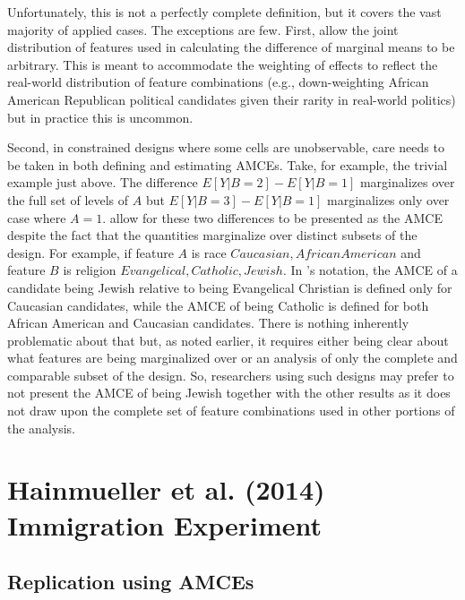 \documentclass[a4paper,12pt]{article}\usepackage[]{graphicx}\usepackage[]{color}
\begin{document}
Unfortunately, this is not a perfectly complete definition, but it covers the vast majority of applied cases. The exceptions are few. First, \citeauthor{HainmuellerHopkinsYamamoto2014} allow the joint distribution of features used in calculating the difference of marginal means to be arbitrary. This is meant to accommodate the weighting of effects to reflect the real-world distribution of feature combinations (e.g., down-weighting African American Republican political candidates given their rarity in real-world politics) but in practice this is uncommon.

Second, in constrained designs where some cells are unobservable, care needs to be taken in both defining and estimating AMCEs. Take, for example, the trivial example just above. The difference $E[Y|B=2]-E[Y|B=1]$ marginalizes over the full set of levels of $A$ but $E[Y|B=3]-E[Y|B=1]$ marginalizes only over case where $A=1$. \citeauthor{HainmuellerHopkinsYamamoto2014} allow for these two differences to be presented as the AMCE despite the fact that the quantities marginalize over distinct subsets of the design. For example, if feature $A$ is race ${Caucasian, African American}$ and feature $B$ is religion ${Evangelical, Catholic, Jewish}$. In \citeauthor{HainmuellerHopkinsYamamoto2014}'s notation, the AMCE of a candidate being Jewish relative to being Evangelical Christian is defined only for Caucasian candidates, while the AMCE of being Catholic is defined for both African American and Caucasian candidates. There is nothing inherently problematic about that but, as noted earlier, it requires either being clear about what features are being marginalized over or an analysis of only the complete and comparable subset of the design. So, researchers using such designs may prefer to not present the AMCE of being Jewish together with the other results as it does not draw upon the complete set of feature combinations used in other portions of the analysis.



\clearpage

\section{Hainmueller et al. (2014) Immigration Experiment}

\subsection{Replication using AMCEs}
\end{document}
